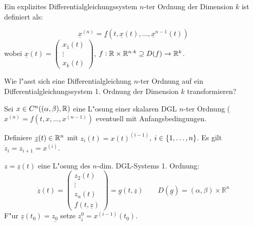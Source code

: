 \documentclass[9pt]{article}
\newcommand{\Rn}{\mathbb{R}^n}
\newcommand{\R}[1]{%
	\ifthenelse{\equal{#1}{}}
	{\mathbb{R}}
	{\mathbb{R}^{#1}}}%
\renewcommand{\vec}[1]{\underline{#1}}
\newenvironment{field}{}{\newpage}
\newif\ifnote
\newenvironment{note}{\notetrue}{\notefalse}
\newcommand{\localtag}{}
\newcommand{\globaltag}{}
\newcommand{\uuid}{}
\newcommand{\tags}[1]{
    \ifnote 
        \renewcommand{\localtag}{#1}
    \else
        \renewcommand{\globaltag}{#1}
    \fi 
    }
\newcommand{\xplain}[1]{\renewcommand{\uuid}{#1}}
\begin{document}
\begin{note}
	\xplain{6bb4d661-91ce-4ef5-9bfd-e5a68ffcce9d}
	\tags{definition, satz, DGL-System}
	
	\begin{field}  %
		Ein explizites Differentialgleichungssystem $n$-ter Ordnung der Dimension $k$ ist definiert als: 
	\end{field}
	
	\begin{field}  %
		\begin{equation*}
			\vec{x}^{(n)} = \vec{f}(t, \vec{x}(t), \dots, \vec{x}^{n-1}(t))
		\end{equation*}
		wobei $\vec{x}(t) = \begin{pmatrix} x_1(t)\\ \vdots\\ x_k(t)  \end{pmatrix}$,
		$f: \R{} \times \R{}^{n\cdot k} \supseteq D(f) \rightarrow \R{k}$. 
	\end{field}
		
	\begin{field}  %
		Wie l"asst sich eine Differentialgleichung $n$-ter Ordnung auf ein Differentialgleichungssystem 1. Ordnung der Dimension $k$ transformieren?
	\end{field}
	
	\begin{field}  %
		Sei $x  \in C^n((\alpha, \beta), \R{})$ eine L"osung einer skalaren DGL $n$-ter Ordnung
		($x^{(n)} = f(t,x, \dots, x^{(n-1)})$ eventuell mit Anfangsbedingungen. 
		 
		Definiere $\vec{z}(t) \in \R{n}$ mit $ z_i(t) = x(t)^{(i-1)}$,
		  $i\in \qty{1,\dots,n}$. Es gilt $\dot{z}_i = z_{i+1} = x^{(i)}$.
		
		$z = \vec{z}(t)$ eine L"osung des $n$-dim. DGL-Systems 1. Ordnung:
		\footnotesize
		\begin{equation*}
			\vec{\dot{z}}(t) = \begin{pmatrix}z_2(t) \\ \vdots \\ z_n(t) \\ f(t, \vec{z})  \end{pmatrix} = \vec{g}(t,\vec{z}) \qquad D(\vec{g}) = (\alpha,\beta) \times \Rn
		\end{equation*} 
		\normalsize
		F"ur $\vec{z}(t_0) = \vec{z_0}$  setze  $z^0_i = x^{(i-1)}(t_0)$. 
	\end{field}
\end{note}
\end{document}
